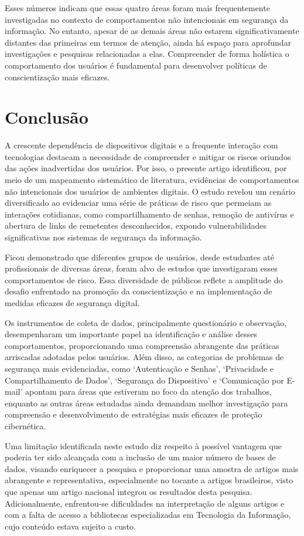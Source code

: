 \documentclass[portuguese]{textolivre}
\begin{document}
Esses números indicam que essas quatro áreas foram mais frequentemente investigadas no contexto de comportamentos não intencionais em segurança da informação. No entanto, apesar de as demais áreas não estarem significativamente distantes das primeiras em termos de atenção, ainda há espaço para aprofundar investigações e pesquisas relacionadas a elas. Compreender de forma holística o comportamento dos usuários é fundamental para desenvolver políticas de conscientização mais eficazes.

\section{Conclusão}\label{sec-links}
A crescente dependência de dispositivos digitais e a frequente interação com tecnologias destacam a necessidade de compreender e mitigar os riscos oriundos das ações inadvertidas dos usuários. Por isso, o presente artigo identificou, por meio de um mapeamento sistemático de literatura, evidências de comportamentos não intencionais dos usuários de ambientes digitais. O estudo revelou um cenário diversificado ao evidenciar uma série de práticas de risco que permeiam as interações cotidianas, como compartilhamento de senhas, remoção de antivírus e abertura de links de remetentes desconhecidos, expondo vulnerabilidades significativas nos sistemas de segurança da informação.

Ficou demonstrado que diferentes grupos de usuários, desde estudantes até profissionais de diversas áreas, foram alvo de estudos que investigaram esses comportamentos de risco. Essa diversidade de públicos reflete a amplitude do desafio enfrentado na promoção da conscientização e na implementação de medidas eficazes de segurança digital.

Os instrumentos de coleta de dados, principalmente questionário e observação, desempenharam um importante papel na identificação e análise desses comportamentos, proporcionando uma compreensão abrangente das práticas arriscadas adotadas pelos usuários. Além disso, as categorias de problemas de segurança mais evidenciadas, como ‘Autenticação e Senhas’, ‘Privacidade e Compartilhamento de Dados’, ‘Segurança do Dispositivo’ e ‘Comunicação por E-mail’ apontam para áreas que estiveram no foco da atenção dos trabalhos, enquanto as outras áreas estudadas ainda demandam melhor investigação para compreensão e desenvolvimento de estratégias mais eficazes de proteção cibernética.

Uma limitação identificada neste estudo diz respeito à possível vantagem que poderia ter sido alcançada com a inclusão de um maior número de bases de dados, visando enriquecer a pesquisa e proporcionar uma amostra de artigos mais abrangente e representativa, especialmente no tocante a artigos brasileiros, visto que apenas um artigo nacional integrou os resultados desta pesquisa. Adicionalmente, enfrentou-se dificuldades na interpretação de alguns artigos e com a falta de acesso a bibliotecas especializadas em Tecnologia da Informação, cujo conteúdo estava sujeito a custo.
\end{document}
